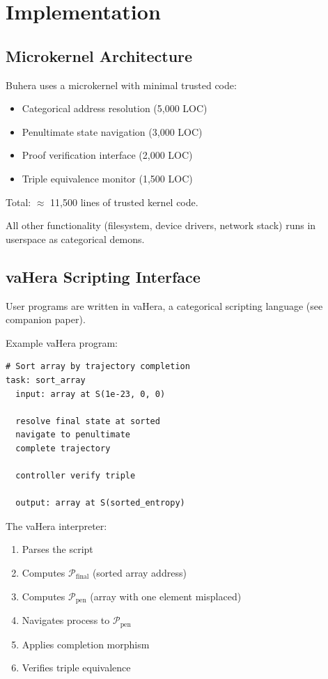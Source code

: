 \documentclass[twocolumn,10pt]{article}
\theoremstyle{definition}
\theoremstyle{remark}
\newcommand{\pentstate}{\mathcal{P}_{\text{pen}}}
\newcommand{\finalstate}{\mathcal{P}_{\text{final}}}
\begin{document}
\section{Implementation}
\label{sec:implementation}

\subsection{Microkernel Architecture}

Buhera uses a microkernel with minimal trusted code:
\begin{itemize}
    \item Categorical address resolution (5,000 LOC)
    \item Penultimate state navigation (3,000 LOC)
    \item Proof verification interface (2,000 LOC)
    \item Triple equivalence monitor (1,500 LOC)
\end{itemize}

Total: $\approx$ 11,500 lines of trusted kernel code.

All other functionality (filesystem, device drivers, network stack) runs in userspace as categorical demons.

\subsection{vaHera Scripting Interface}

User programs are written in vaHera, a categorical scripting language (see companion paper).

Example vaHera program:
\begin{verbatim}
# Sort array by trajectory completion
task: sort_array
  input: array at S(1e-23, 0, 0)

  resolve final state at sorted
  navigate to penultimate
  complete trajectory

  controller verify triple

  output: array at S(sorted_entropy)
\end{verbatim}

The vaHera interpreter:
\begin{enumerate}
    \item Parses the script
    \item Computes $\finalstate$ (sorted array address)
    \item Computes $\pentstate$ (array with one element misplaced)
    \item Navigates process to $\pentstate$
    \item Applies completion morphism
    \item Verifies triple equivalence
\end{enumerate}
\end{document}
